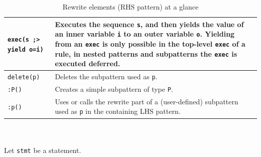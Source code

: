 \begin{table}[htbp]
\begin{minipage}{\linewidth}
\begin{tabularx}{\linewidth}{|lX|}
\hline
\texttt{exec(s ;> yield o=i)} & Executes the sequence \texttt{s}, and then yields the value of an inner variable \texttt{i} to an outer variable \texttt{o}. Yielding from an \texttt{exec} is only possible in the top-level \texttt{exec} of a rule, in nested patterns and subpatterns the \texttt{exec} is executed deferred.\\
\hline
\texttt{delete(p)} & Deletes the subpattern used as \texttt{p}.\\
\texttt{:P()} & Creates a simple subpattern of type \texttt{P}.\\
\texttt{:p()} & Uses or calls the rewrite part of a (user-defined) subpattern used as \texttt{p} in the containing LHS pattern.\\
\hline
\end{tabularx}
\end{minipage}\\
\\ 
{\small Let \texttt{stmt} be a statement.}
\caption{Rewrite elements (RHS pattern) at a glance}
\label{rewritestab}
\end{table}

